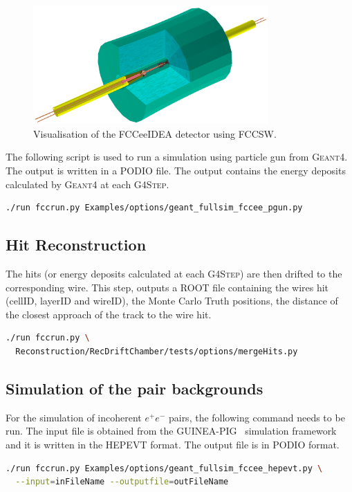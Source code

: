 \begin{figure}[!t]
\centering
\includegraphics[width=0.8\textwidth]{figures/FCCeeIDEA_IR}

\caption{Visualisation of the FCCeeIDEA detector using FCCSW.}
\label{fig_sim_vis}
\end{figure}

The following script is used to run a simulation using particle gun from \textsc{Geant4}. The output is written in a PODIO file. The output contains the energy deposits calculated by \textsc{Geant4} at each \textsc{G4Step}.

\begin{lstlisting}[language=bash,caption={Particle gun simulation.}]
./run fccrun.py Examples/options/geant_fullsim_fccee_pgun.py
\end{lstlisting}

\subsection{Hit Reconstruction}

The hits (or energy deposits calculated at each \textsc{G4Step}) are then drifted to the corresponding wire. This step, outputs a ROOT file containing the wires hit (cellID, layerID and wireID), the Monte Carlo Truth positions, the distance of the closest approach of the track to the wire hit.

\begin{lstlisting}[language=bash,caption={Reconstruction of the simulated hits for the drift chamber.}]
  ./run fccrun.py \
  Reconstruction/RecDriftChamber/tests/options/mergeHits.py
\end{lstlisting}

\subsection{Simulation of the pair backgrounds}
For the simulation of incoherent $e^+e^-$ pairs, the following command needs to be run. The input file is obtained from the \textsc{GUINEA-PIG}~\cite{Schulte:382453} simulation framework and it is written in the \textsc{HEPEVT} format. The output file is in \textsc{PODIO} format.

\begin{lstlisting}[language=bash,caption={Simulation of the incoherent pair background.}]
  ./run fccrun.py Examples/options/geant_fullsim_fccee_hepevt.py \
  --input=inFileName --outputfile=outFileName
\end{lstlisting}
